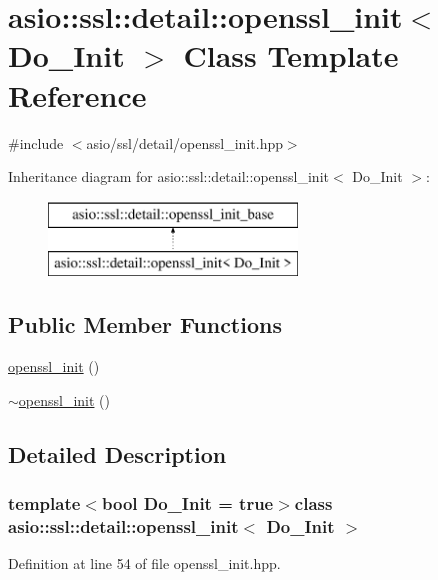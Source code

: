 \hypertarget{classasio_1_1ssl_1_1detail_1_1openssl__init}{}\section{asio\+:\+:ssl\+:\+:detail\+:\+:openssl\+\_\+init$<$ Do\+\_\+\+Init $>$ Class Template Reference}
\label{classasio_1_1ssl_1_1detail_1_1openssl__init}


{\ttfamily \#include $<$asio/ssl/detail/openssl\+\_\+init.\+hpp$>$}

Inheritance diagram for asio\+:\+:ssl\+:\+:detail\+:\+:openssl\+\_\+init$<$ Do\+\_\+\+Init $>$\+:\begin{figure}[H]
\begin{center}
\leavevmode
\includegraphics[height=2.000000cm]{classasio_1_1ssl_1_1detail_1_1openssl__init}
\end{center}
\end{figure}
\subsection*{Public Member Functions}
\begin{DoxyCompactItemize}
\item 
\hyperlink{classasio_1_1ssl_1_1detail_1_1openssl__init_a7e82447620111b6fb4eb7cbf2fe26c2e}{openssl\+\_\+init} ()
\item 
\hyperlink{classasio_1_1ssl_1_1detail_1_1openssl__init_a910b9f60c1ced40d0b371ca328baeb09}{$\sim$openssl\+\_\+init} ()
\end{DoxyCompactItemize}


\subsection{Detailed Description}
\subsubsection*{template$<$bool Do\+\_\+\+Init = true$>$class asio\+::ssl\+::detail\+::openssl\+\_\+init$<$ Do\+\_\+\+Init $>$}



Definition at line 54 of file openssl\+\_\+init.\+hpp.



